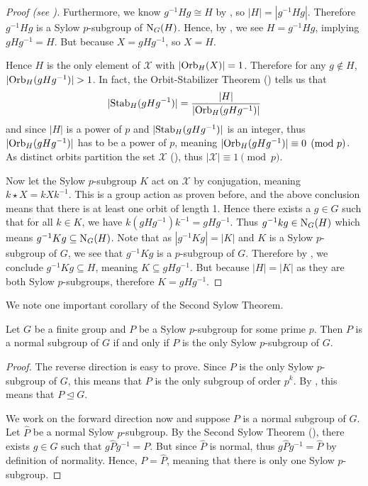 \begin{proof}[Proof (see {\cite[Theorem 11.10]{humphreys_1996}})]
    Furthermore, we know $g^{-1}Hg \cong H$ by , so $|H| = |g^{-1}Hg|$. Therefore $g^{-1}Hg$ is a Sylow $p$-subgroup of $\mathrm{N}_{G}(H)$. Hence, by , we see $H = g^{-1}Hg$, implying $gHg^{-1} = H$. But because $X = gHg^{-1}$, so $X = H$.

    Hence $H$ is the only element of $\mathcal{X}$ with $|\mathrm{Orb}_{H}(X)| = 1$. Therefore for any $g \notin H$, $|\mathrm{Orb}_{H}(gHg^{-1})| > 1$. In fact, the Orbit-Stabilizer Theorem () tells us that
    \[
        |\mathrm{Stab}_{H}(gHg^{-1})| = \frac{|H|}{|\mathrm{Orb}_{H}(gHg^{-1})|}
    \]
    and since $|H|$ is a power of $p$ and $|\mathrm{Stab}_{H}(gHg^{-1})|$ is an integer, thus $|\mathrm{Orb}_{H}(gHg^{-1})|$ has to be a power of $p$, meaning $|\mathrm{Orb}_{H}(gHg^{-1})| \equiv 0 \pmod p$. As distinct orbits partition the set $\mathcal{X}$ (), thus $|\mathcal{X}| \equiv 1 \pmod p$.

    Now let the Sylow $p$-subgroup $K$ act on $\mathcal{X}$ by conjugation, meaning $k \star X = kXk^{-1}$. This is a group action as proven before, and the above conclusion means that there is at least one orbit of length 1. Hence there exists a $g \in G$ such that for all $k \in K$, we have $k(gHg^{-1})k^{-1} = gHg^{-1}$. Thus $g^{-1}kg \in \mathrm{N}_{G}(H)$ which means $g^{-1}Kg \subseteq \mathrm{N}_{G}(H)$. Note that as $|g^{-1}Kg| = |K|$ and $K$ is a Sylow $p$-subgroup of $G$, we see that $g^{-1}Kg$ is a $p$-subgroup of $G$. Therefore by , we conclude $g^{-1}Kg \subseteq H$, meaning $K \subseteq gHg^{-1}$. But because $|H| = |K|$ as they are both Sylow $p$-subgroups, therefore $K = gHg^{-1}$.
\end{proof}

We note one important corollary of the Second Sylow Theorem.
\begin{corollary}\label{corollary-sylow-subgroup-is-normal-if-it-is-unique}
    Let $G$ be a finite group and $P$ be a Sylow $p$-subgroup for some prime $p$. Then $P$ is a normal subgroup of $G$ if and only if $P$ is the only Sylow $p$-subgroup of $G$.
\end{corollary}
\begin{proof}
    The reverse direction is easy to prove. Since $P$ is the only Sylow $p$-subgroup of $G$, this means that $P$ is the only subgroup of order $p^k$. By , this means that $P \unlhd G$.

    We work on the forward direction now and suppose $P$ is a normal subgroup of $G$. Let $\hat{P}$ be a normal Sylow $p$-subgroup. By the Second Sylow Theorem (), there exists $g \in G$ such that $g\hat{P}g^{-1} = P$. But since $\hat{P}$ is normal, thus $g\hat{P}g^{-1} = \hat{P}$ by definition of normality. Hence, $P = \hat{P}$, meaning that there is only one Sylow $p$-subgroup.
\end{proof}

